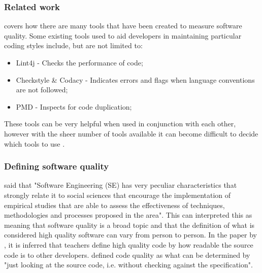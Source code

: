 \subsubsection{Related work}

\cite{8681007} covers how there are many tools that have been created to measure software quality. Some existing tools used to aid developers in maintaining particular coding styles include, but are not limited to:
\begin{itemize}
	\item Lint4j - Checks the performance of code;
	\item Checkstyle \& Codacy - Indicates errors and flags when language conventions are not followed;
	\item PMD - Inspects for code duplication;
\end{itemize}
These tools can be very helpful when used in conjunction with each other, however with the sheer number of tools available it can become difficult to decide which tools to use \citep{6606742}.

\subsubsection{Defining software quality}
\cite{6606742} said that "Software Engineering (SE) has very peculiar characteristics that strongly relate it to social sciences that encourage the implementation of empirical studies that are able to assess the effectiveness of techniques, methodologies and processes proposed in the area". This can interpreted this as meaning that software quality is a broad topic and that the definition of what is considered high quality software can vary from person to person. In the paper by \cite{10.1145/3428029.3428047}, it is inferred that teachers define high quality code by how readable the source code is to other developers. \cite{10.1145/3428029.3428047, 10.1145/2674683.2674702} defined code quality as what can be determined by "just looking at the source code, i.e. without checking against the specification".
